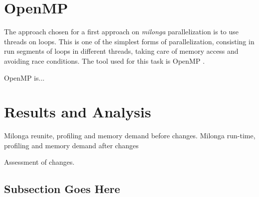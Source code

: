 \documentclass{anstrans}
\renewcommand{\vec}[1]{\bm{#1}} %
\newcommand{\vd}{\bm{\cdot}} %
\newcommand{\grad}{\vec{\nabla}} %
\newcommand{\ud}{\mathop{}\!\mathrm{d}} %
\begin{document}

\section{OpenMP}

The approach chosen for a first approach on \textit{milonga} parallelization
is to use threads on loops. This is one of the simplest forms of parallelization,
consisting in run segments of loops in different threads, taking care of memory
access and avoiding race conditions. The tool used for this task is OpenMP
\cite{Dagum1998}.

OpenMP is...



\section{Results and Analysis}

Milonga reunite, profiling and memory demand before changes.
Milonga run-time, profiling and memory demand after changes

Assessment of changes.

\subsection{Subsection Goes Here}
\end{document}
